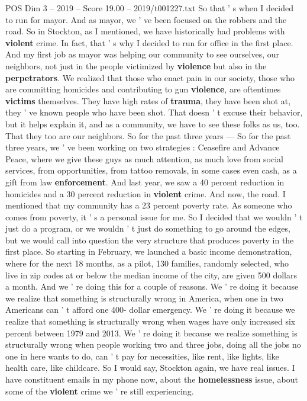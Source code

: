 \begin{textsample}{POS Dim 3 – 2019 – Score 19.00 – 2019/t001227.txt}
So that ' s when I decided to run for mayor.
And as mayor, we ' ve been focused on the robbers and the road.
So in Stockton, as I mentioned, we have historically had problems with \textbf{violent} crime.
In fact, that ' s why I decided to run for office in the first place.
And my first job as mayor was helping our community to see ourselves, our neighbors, not just in the people victimized by \textbf{violence} but also in the \textbf{perpetrators}.
We realized that those who enact pain in our society, those who are committing homicides and contributing to gun \textbf{violence}, are oftentimes \textbf{victims} themselves.
They have high rates of \textbf{trauma}, they have been shot at, they ' ve known people who have been shot.
That doesn ' t excuse their behavior, but it helps explain it, and as a community, we have to see these folks as us, too.
That they too are our neighbors.
So for the past three years — So for the past three years, we ' ve been working on two strategies : Ceasefire and Advance Peace, where we give these guys as much attention, as much love from social services, from opportunities, from tattoo removals, in some cases even cash, as a gift from law \textbf{enforcement}.
And last year, we saw a 40 percent reduction in homicides and a 30 percent reduction in \textbf{violent} crime.
And now, the road.
I mentioned that my community has a 23 percent poverty rate.
As someone who comes from poverty, it ' s a personal issue for me.
So I decided that we wouldn ' t just do a program, or we wouldn ' t just do something to go around the edges, but we would call into question the very structure that produces poverty in the first place.
So starting in February, we launched a basic income demonstration, where for the next 18 months, as a pilot, 130 families, randomly selected, who live in zip codes at or below the median income of the city, are given 500 dollars a month.
And we ' re doing this for a couple of reasons.
We ' re doing it because we realize that something is structurally wrong in America, when one in two Americans can ' t afford one 400- dollar emergency.
We ' re doing it because we realize that something is structurally wrong when wages have only increased six percent between 1979 and 2013.
We ' re doing it because we realize something is structurally wrong when people working two and three jobs, doing all the jobs no one in here wants to do, can ' t pay for necessities, like rent, like lights, like health care, like childcare.
So I would say, Stockton again, we have real issues.
I have constituent emails in my phone now, about the \textbf{homelessness} issue, about some of the \textbf{violent} crime we ' re still experiencing.

\end{textsample}
